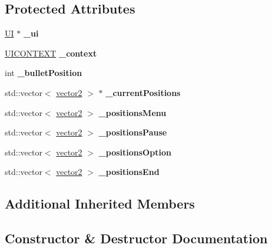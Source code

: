 \subsection*{Protected Attributes}
\begin{DoxyCompactItemize}
\item 
\hypertarget{class_u_i_bullet_a75026bf852c57c18b5b4147cd65b1569}{}\label{class_u_i_bullet_a75026bf852c57c18b5b4147cd65b1569} 
\hyperlink{class_u_i}{UI} $\ast$ {\bfseries \+\_\+ui}
\item 
\hypertarget{class_u_i_bullet_a40405d6b8e46afab0e80e492d18a7605}{}\label{class_u_i_bullet_a40405d6b8e46afab0e80e492d18a7605} 
\hyperlink{struct_u_i_c_o_n_t_e_x_t}{U\+I\+C\+O\+N\+T\+E\+XT} {\bfseries \+\_\+context}
\item 
\hypertarget{class_u_i_bullet_a31d3c1d359452ec5b42818cba93ed826}{}\label{class_u_i_bullet_a31d3c1d359452ec5b42818cba93ed826} 
int {\bfseries \+\_\+bullet\+Position}
\item 
\hypertarget{class_u_i_bullet_a96bef745931cfe60f0589a8bfb3f3c59}{}\label{class_u_i_bullet_a96bef745931cfe60f0589a8bfb3f3c59} 
std\+::vector$<$ \hyperlink{structvector2}{vector2} $>$ $\ast$ {\bfseries \+\_\+current\+Positions}
\item 
\hypertarget{class_u_i_bullet_a86f3119876cf8280f4e3fdf063b066df}{}\label{class_u_i_bullet_a86f3119876cf8280f4e3fdf063b066df} 
std\+::vector$<$ \hyperlink{structvector2}{vector2} $>$ {\bfseries \+\_\+positions\+Menu}
\item 
\hypertarget{class_u_i_bullet_ae76d00fdcf1303e1f5d0044c2f64821c}{}\label{class_u_i_bullet_ae76d00fdcf1303e1f5d0044c2f64821c} 
std\+::vector$<$ \hyperlink{structvector2}{vector2} $>$ {\bfseries \+\_\+positions\+Pause}
\item 
\hypertarget{class_u_i_bullet_a02817d444f3f05df2e8ef4e11df1f9ae}{}\label{class_u_i_bullet_a02817d444f3f05df2e8ef4e11df1f9ae} 
std\+::vector$<$ \hyperlink{structvector2}{vector2} $>$ {\bfseries \+\_\+positions\+Option}
\item 
\hypertarget{class_u_i_bullet_a899fbe9c31a16f1247bbdc07063c6069}{}\label{class_u_i_bullet_a899fbe9c31a16f1247bbdc07063c6069} 
std\+::vector$<$ \hyperlink{structvector2}{vector2} $>$ {\bfseries \+\_\+positions\+End}
\end{DoxyCompactItemize}
\subsection*{Additional Inherited Members}


\subsection{Constructor \& Destructor Documentation}
\hypertarget{class_u_i_bullet_a5036f0f1649cbb182b46a37ba4096bc1}{}\label{class_u_i_bullet_a5036f0f1649cbb182b46a37ba4096bc1} 
